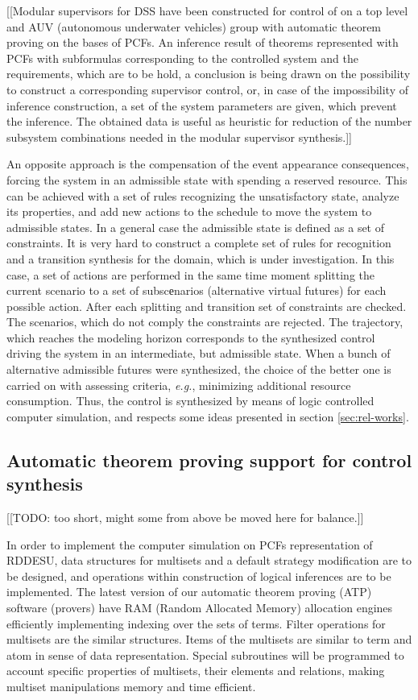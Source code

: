 \documentclass[runningheads]{llncs}
\begin{document}
[[Modular supervisors for DSS have been constructed for control of on a top level and AUV (autonomous underwater vehicles) group with automatic theorem proving on the bases of PCFs. An inference result of theorems represented with PCFs with subformulas corresponding to the controlled system and the requirements, which are to be hold, a conclusion is being drawn on the possibility to construct a corresponding supervisor control, or, in case of the impossibility of inference construction, a set of the system parameters are given, which prevent the inference. The obtained data is useful as heuristic for reduction of the number subsystem combinations needed in the modular supervisor synthesis.]]

An opposite approach is the compensation of the event appearance consequences, forcing the system in an admissible state with spending a reserved resource. This can be achieved with a set of rules recognizing the unsatisfactory state, analyze its properties, and add new actions to the schedule to move the system to admissible states. In a general case the admissible state is defined as a set of constraints. It is very hard to construct a complete set of rules for recognition and a transition synthesis for the domain, which is under investigation. In this case, a set of actions are performed in the same time moment splitting the current scenario to a set of subscеnarios (alternative virtual futures) for each possible action. After each splitting and transition set of constraints are checked. The scenarios, which do not comply the constraints are rejected. The trajectory, which reaches the modeling horizon corresponds to the synthesized control driving the system in an intermediate, but admissible state. When a bunch of alternative admissible futures were synthesized, the choice of the better one is carried on with assessing criteria, \emph{e.g.}, minimizing additional resource consumption. Thus, the control is synthesized by means of logic controlled computer simulation, and respects some ideas presented in section \ref{sec:rel-works}.


\subsection{Automatic theorem proving support for control synthesis}
\label{sec:sub-atp-support}

[[TODO: too short, might some from above be moved here for balance.]]

In order to implement the computer simulation on PCFs representation of RDDESU, data structures for multisets and a default strategy modification are to be designed, and operations within construction of logical inferences are to be implemented.  The latest version of our automatic theorem proving (ATP) software (provers) have RAM (Random Allocated Memory) allocation engines efficiently implementing indexing over the sets of terms. Filter operations for multisets are the similar structures. Items of the multisets are similar to term and atom in sense of data representation. Special subroutines will be programmed to account specific properties of multisets, their elements and relations, making multiset manipulations memory and time efficient.
\end{document}
